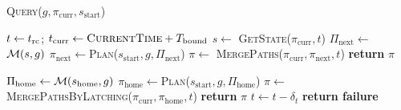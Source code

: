\documentclass[a4paper]{report}
\begin{document}
\begin{algorithm}[t]
\caption{\textsc{Query}($g, \pi_{\textrm{curr}},s_{\textrm{start}}$)}\label{alg:query}  
    \AlgFontSize
\begin{algorithmic}[1]

\State $t \leftarrow t_{\textrm{rc}}$; \hspace{3mm} $t_{\textrm{curr}}\leftarrow \textsc{CurrentTime} + T_{\textrm{bound}}$
    \State $s \leftarrow$ \textsc{GetState}($\pi_{\textrm{curr}}, t$)
        \label{alg:query:line:c2a}
    \State $\Pi_{\textrm{next}} \leftarrow$ $\mathcal{M}(s,g)$ 
        \State $\pi_{\textrm{next}} \leftarrow$\textsc{Plan}($s_{\textrm{start}},g,\Pi_{\textrm{next}}$)
        \State $\pi \leftarrow$ \textsc{MergePaths}($\pi_{\textrm{curr}},\pi_{\textrm{next}},t$)
        \State \textbf{return} $\pi$
        \label{alg:query:line:c2b}
    \EndIf

\vspace{2mm}

    \State $\Pi_{\textrm{home}} \leftarrow \mathcal{M} (s_{\textrm{home}},g)$
     \label{alg:query:line:c3a}
            \State $\pi_{\textrm{home}} \leftarrow$\textsc{Plan}($s_{\textrm{start}},g,\Pi_{\textrm{home}}$)
            \State $\pi \leftarrow$ \textsc{MergePathsByLatching}($\pi_{\textrm{curr}},\pi_{\textrm{home}}, t$)
            \State \textbf{return} $\pi$
            \label{alg:query:line:c3b}
        \EndIf
    \EndIf
    \State $t \leftarrow t - \delta_t$
\EndWhile
\State \textbf{return failure}
\end{algorithmic}
\end{algorithm}
\end{document}
